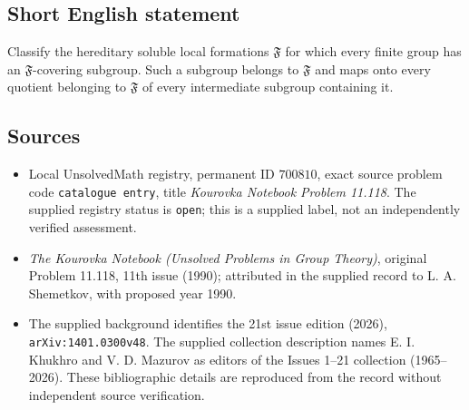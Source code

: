 \documentclass[11pt]{article}
\begin{document}
\subsection{Short English statement}
Classify the hereditary soluble local formations \(\mathfrak F\) for which every finite group has an \(\mathfrak F\)-covering subgroup. Such a subgroup belongs to \(\mathfrak F\) and maps onto every quotient belonging to \(\mathfrak F\) of every intermediate subgroup containing it.
\subsection{Sources}
\begin{itemize}
\item Local UnsolvedMath registry, permanent ID \(700810\), exact source problem code \texttt{catalogue entry}, title \emph{Kourovka Notebook Problem 11.118}. The supplied registry status is \texttt{open}; this is a supplied label, not an independently verified assessment.
\item \emph{The Kourovka Notebook (Unsolved Problems in Group Theory)}, original Problem 11.118, 11th issue (1990); attributed in the supplied record to L. A. Shemetkov, with proposed year 1990.
\item The supplied background identifies the 21st issue edition (2026), \texttt{arXiv:1401.0300v48}. The supplied collection description names E. I. Khukhro and V. D. Mazurov as editors of the Issues 1--21 collection (1965--2026). These bibliographic details are reproduced from the record without independent source verification.
\end{itemize}
\end{document}
